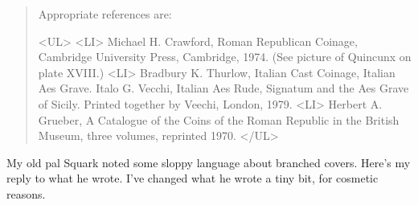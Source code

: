 \begin{quote}
Appropriate references are:

<UL>
<LI>
Michael H. Crawford, Roman Republican Coinage, Cambridge University
Press, Cambridge, 1974.   (See picture of Quincunx on plate XVIII.)
<LI>
Bradbury K. Thurlow, 
Italian Cast Coinage, Italian Aes Grave.
Italo G. Vecchi, Italian Aes Rude, Signatum and the Aes Grave of Sicily.
Printed together by Veechi, London, 1979.
<LI>
Herbert A. Grueber,
A Catalogue of the Coins of the Roman Republic
in the British Museum, three volumes, reprinted 1970.
</UL>

\end{quote}

My old pal Squark noted some sloppy language about branched covers.  
Here's my reply to what he wrote.  I've changed what he wrote a tiny
bit, for cosmetic reasons.


